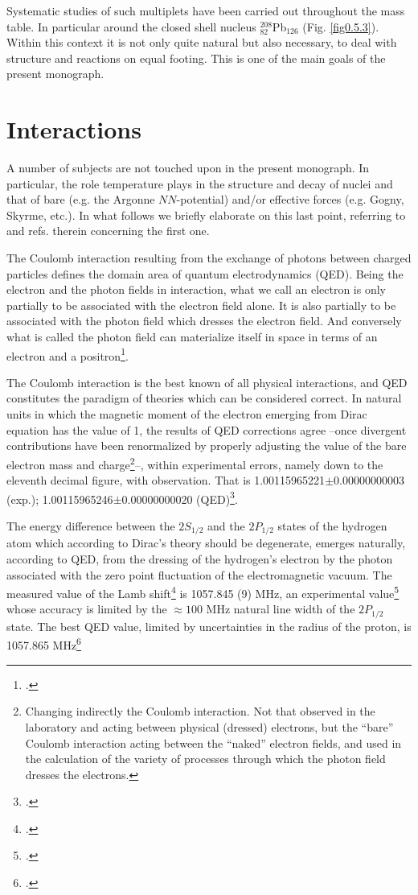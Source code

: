 Systematic studies of such multiplets have been carried out throughout the mass table. In particular around the closed shell nucleus $^{208}_{82}$Pb$_{126}$ (Fig. \ref{fig0.5.3}). Within this context it is not only  quite natural but also necessary, to deal with structure and reactions on equal footing.  This is one of the main goals of the present monograph. 
\section{Interactions}\label{S1.9}
A number of subjects are not touched upon in the present monograph. In particular, the role temperature plays in the structure and decay of nuclei and that of bare (e.g. the Argonne $NN$-potential) and/or effective forces (e.g. Gogny, Skyrme, etc.). In what follows we briefly elaborate on this last point, referring to \cite{Bortignon:98} and refs. therein concerning the first one.

The Coulomb interaction resulting from the exchange of photons between charged particles defines the domain area of quantum electrodynamics (QED). Being the electron and the photon fields in interaction, what we call an electron is only partially to be associated with the electron field alone. It is also partially to be associated with the photon field which dresses the electron field. And conversely what is called the photon field can materialize itself in space in terms of an electron and a positron\footnote{\cite{Schwinger:01}.}.

The Coulomb interaction is the best known of all physical interactions, and QED constitutes the paradigm of theories which can be considered correct. In natural units in which the magnetic moment of the electron emerging from Dirac equation has the value of 1, the results of QED corrections agree --once divergent contributions have been renormalized by properly adjusting the value of the bare electron mass and charge\footnote{Changing indirectly the Coulomb interaction. Not that observed in the laboratory and acting between physical (dressed) electrons, but the ``bare'' Coulomb interaction acting between the ``naked'' electron fields, and used in the calculation of the variety of processes through which the photon field dresses the electrons.}--, within experimental errors, namely down to the eleventh decimal figure, with observation. That is 1.00115965221$\pm$0.00000000003 (exp.); 1.00115965246$\pm$0.00000000020 (QED)\footnote{\cite{Kinoshita:90}.}.


 The energy difference between the $2S_{1/2}$ and the $2P_{1/2}$ states of the hydrogen atom which according to Dirac's theory should be degenerate, emerges naturally, according to QED, from the dressing of the hydrogen's electron by the photon associated with the zero point fluctuation of the electromagnetic vacuum. The measured value of the Lamb shift\footnote{\cite{Lamb:51b}.}  is 1057.845 (9) MHz, an experimental value\footnote{\cite{Lundeen:81,Lundeen:86,Pipkin:90}.} whose accuracy is limited by the $\approx 100$ MHz natural line width of the $2P_{1/2}$ state. The best QED value, limited by uncertainties in the radius of the proton, is 1057.865 MHz\footnote{\cite{Sapirstein:90,Grotch:94}.}

